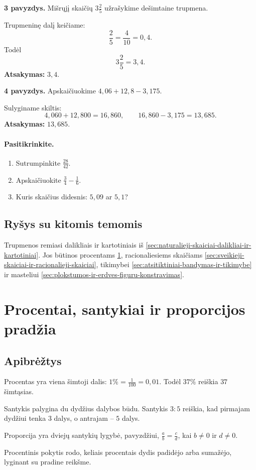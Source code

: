 \textbf{3 pavyzdys.} Mišrųjį skaičių \(3\frac{2}{5}\) užrašykime dešimtaine trupmena.

Trupmeninę dalį keičiame:
\[
\frac{2}{5}=\frac{4}{10}=0,4.
\]
Todėl
\[
3\frac{2}{5}=3,4.
\]
\textbf{Atsakymas:} \(3,4\).

\textbf{4 pavyzdys.} Apskaičiuokime \(4,06+12,8-3,175\).

Sulyginame skiltis:
\[
4,060+12,800=16,860,\qquad 16,860-3,175=13,685.
\]
\textbf{Atsakymas:} \(13,685\).

\paragraph{Pasitikrinkite.}
\begin{enumerate}[label=\arabic*.]
\item Sutrumpinkite \(\frac{28}{42}\).
\item Apskaičiuokite \(\frac{3}{4}-\frac{1}{6}\).
\item Kuris skaičius didesnis: \(5,09\) ar \(5,1\)?
\end{enumerate}

\subsection{Ryšys su kitomis temomis}
Trupmenos remiasi dalikliais ir kartotiniais iš \ref{sec:naturalieji-skaiciai-dalikliai-ir-kartotiniai}. Jos būtinos procentams \ref{sec:procentai-santykiai-ir-proporcijos-pradzia}, racionaliesiems skaičiams \ref{sec:sveikieji-skaiciai-ir-racionalieji-skaiciai}, tikimybei \ref{sec:atsitiktiniai-bandymas-ir-tikimybe} ir masteliui \ref{sec:plokstumos-ir-erdves-figuru-konstravimas}.

\section{Procentai, santykiai ir proporcijos pradžia}\label{sec:procentai-santykiai-ir-proporcijos-pradzia}

\subsection{Apibrėžtys}
\begin{apibreztis}
Procentas yra viena šimtoji dalis: \(1\%=\frac{1}{100}=0,01\). Todėl \(37\%\) reiškia \(37\) šimtąsias.
\end{apibreztis}
\begin{apibreztis}
Santykis palygina du dydžius dalybos būdu. Santykis \(3:5\) reiškia, kad pirmajam dydžiui tenka \(3\) dalys, o antrajam -- \(5\) dalys.
\end{apibreztis}
\begin{apibreztis}
Proporcija yra dviejų santykių lygybė, pavyzdžiui, \(\frac{a}{b}=\frac{c}{d}\), kai \(b\ne 0\) ir \(d\ne 0\).
\end{apibreztis}
\begin{apibreztis}
Procentinis pokytis rodo, keliais procentais dydis padidėjo arba sumažėjo, lyginant su pradine reikšme.
\end{apibreztis}

